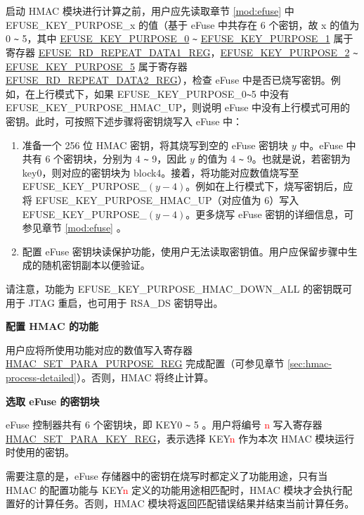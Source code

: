 \documentclass[main\_\_CN.tex]{subfiles}
\begin{document}
启动 HMAC 模块进行计算之前，用户应先读取章节 \ref{mod:efuse} \textit{} 中 EFUSE\_KEY\_PURPOSE\_x 的值（基于 eFuse 中共存在 6 个密钥，故 x 的值为 0 \verb+~+ 5，其中 \hyperref[fielddesc:EFUSEKEYPURPOSE0]{EFUSE\_KEY\_PURPOSE\_0} \verb+~+ \hyperref[fielddesc:EFUSEKEYPURPOSE1]{EFUSE\_KEY\_PURPOSE\_1} 属于寄存器 \hyperref[regdesc:EFUSERDREPEATDATA1REG]{EFUSE\_RD\_REPEAT\_DATA1\_REG}，\hyperref[fielddesc:EFUSEKEYPURPOSE2]{EFUSE\_KEY\_PURPOSE\_2} \verb+~+ \hyperref[fielddesc:EFUSEKEYPURPOSE5]{EFUSE\_KEY\_PURPOSE\_5} 属于寄存器 \hyperref[regdesc:EFUSERDREPEATDATA2REG]{EFUSE\_RD\_REPEAT\_DATA2\_REG}），检查 eFuse 中是否已烧写密钥。例如，在上行模式下，如果 EFUSE\_KEY\_PURPOSE\_0\verb+~+5 中没有 EFUSE\_KEY\_PURPOSE\_HMAC\_UP，则说明 eFuse 中没有上行模式可用的密钥。此时，可按照下述步骤将密钥烧写入 eFuse 中：

\begin{enumerate}
    \item 准备一个 256 位 HMAC 密钥，将其烧写到空的 eFuse 密钥块 $y$ 中。eFuse 中共有 6 个密钥块，分别为 4 \verb+~+ 9，因此 $y$ 的值为 4 \verb+~+ 9。也就是说，若密钥为 key0，则对应的密钥块为 block4。接着，将功能对应数值烧写至 EFUSE\_KEY\_PURPOSE\_$(y-4)$。例如在上行模式下，烧写密钥后，应将 EFUSE\_KEY\_PURPOSE\_HMAC\_UP（对应值为 6）写入 EFUSE\_KEY\_PURPOSE\_$(y-4)$。更多烧写 eFuse 密钥的详细信息，可参见章节 \ref{mod:efuse} \textit{}。
    \item 配置 eFuse 密钥块读保护功能，使用户无法读取密钥值。用户应保留步骤中生成的随机密钥副本以便验证。
\end{enumerate}

请注意，功能为 EFUSE\_KEY\_PURPOSE\_HMAC\_DOWN\_ALL 的密钥既可用于 JTAG 重启，也可用于 RSA\_DS 密钥导出。




\textbf{配置 HMAC 的功能}

用户应将所使用功能对应的数值写入寄存器 \hyperref[regdesc:HMACSETPARAPURPOSEREG]{HMAC\_SET\_PARA\_PURPOSE\_REG} 完成配置（可参见章节 \ref{sec:hmac-process-detailed}）。否则，HMAC 将终止计算。

\textbf{选取 eFuse 的密钥块}
\label{sec:hmac-config-efuse-key}

eFuse 控制器共有 6 个密钥块，即 KEY0 \verb+~+ 5 。用户将编号 \textcolor{red}{n} 写入寄存器 \hyperref[regdesc:HMACSETPARAKEYREG]{HMAC\_SET\_PARA\_KEY\_REG}，表示选择 KEY\textcolor{red}{n} 作为本次 HMAC 模块运行时使用的密钥。

需要注意的是，eFuse 存储器中的密钥在烧写时都定义了功能用途，只有当 HMAC 的配置功能与 KEY\textcolor{red}{n} 定义的功能用途相匹配时，HMAC 模块才会执行配置好的计算任务。否则，HMAC 模块将返回匹配错误结果并结束当前计算任务。
\end{document}
